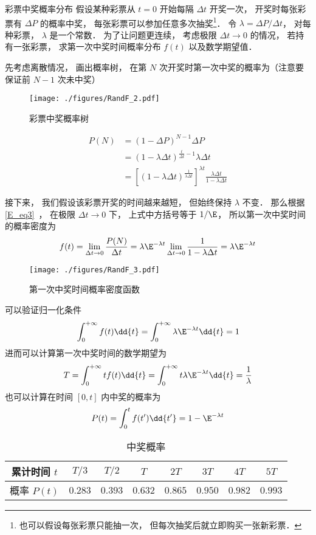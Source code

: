\begin{example}{彩票中奖概率分布}
假设某种彩票从 $t = 0$ 开始每隔 $\Delta t$ 开奖一次， 开奖时每张彩票有 $\Delta P$ 的概率中奖， 每张彩票可以参加任意多次抽奖\footnote{也可以假设每张彩票只能抽一次， 但每次抽奖后就立即购买一张新彩票．}． 令 $\lambda = {\Delta P}/{\Delta t}$， 对每种彩票， $\lambda$ 是一个常数． 为了让问题更连续， 考虑极限 $\Delta t\to 0$ 的情况， 若持有一张彩票， 求第一次中奖时间概率分布 $f(t)$ 以及数学期望值．

先考虑离散情况， 画出概率树， 在第 $N$ 次开奖时第一次中奖的概率为（注意要保证前 $N-1$ 次未中奖）
\begin{figure}[ht]
\centering
\texttt{[image: ./figures/RandF\_2.pdf]}
\caption{彩票中奖概率树} \label{RandF_fig2}
\end{figure}
\begin{equation}
\begin{aligned}
P(N) &= (1-\Delta P)^{N-1} \Delta P\\
&= (1-\lambda\Delta t)^{\frac{t}{\Delta t}-1} \lambda\Delta t\\
&= [(1-\lambda\Delta t)^{\frac{1}{\lambda\Delta t}}]^{\lambda t} \frac{\lambda\Delta t}{1-\lambda\Delta t}
\end{aligned}
\end{equation}

接下来， 我们假设该彩票开奖的时间越来越短， 但始终保持 $\lambda$ 不变． 那么根据\autoref{E_eq3}~， 在极限 $\Delta t\to 0$ 下， 上式中方括号等于 $1/\E$， 所以第一次中奖时间的概率密度为
\begin{equation}
f(t) = \lim_{\Delta t\to 0} \frac{P(N)}{\Delta t} = \lambda\E^{-\lambda t}\lim_{\Delta t\to 0} \frac{1}{1-\lambda\Delta t} = \lambda\E^{-\lambda t}
\end{equation}
\begin{figure}[ht]
\centering
\texttt{[image: ./figures/RandF\_3.pdf]}
\caption{第一次中奖时间概率密度函数} \label{RandF_fig3}
\end{figure}
可以验证归一化条件
\begin{equation}
\int_0^{+\infty} f(t) \dd{t} = \int_0^{+\infty} \lambda\E^{-\lambda t} \dd{t} = 1
\end{equation}
进而可以计算第一次中奖时间的数学期望为
\begin{equation}
T = \int_0^{+\infty} t f(t) \dd{t} = \int_0^{+\infty}t \lambda\E^{-\lambda t} \dd{t} = \frac{1}{\lambda}
\end{equation}
也可以计算在时间 $[0, t]$ 内中奖的概率为
\begin{equation}
P(t) = \int_0^{t} f(t') \dd{t'} = 1 - \E^{-\lambda t}
\end{equation}
\begin{table}[ht]
\centering
\caption{中奖概率}\label{RandF_tab2}
\begin{tabular}{|c|c|c|c|c|c|c|c|}
\hline
累计时间 $t$ & $T/3$  & $T/2$  & $T$     & $2T$ &     $3T$   &  $4T$   & $5T$\\
\hline
概率 $P(t)$ & $0.283$ & $0.393$ & $0.632$ & $0.865$ & $0.950$ & $0.982$ & $0.993$\\
\hline
\end{tabular}
\end{table}
\end{example}
